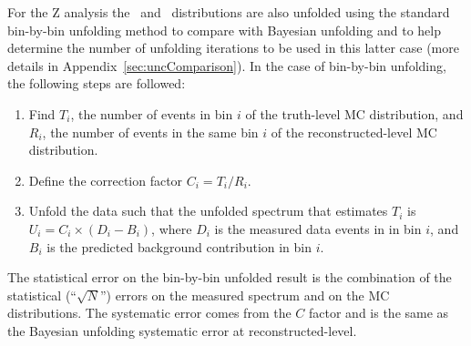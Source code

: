 For the Z analysis the \ptdilep\ and \ut\ distributions are also unfolded using the standard bin-by-bin unfolding method to compare with Bayesian unfolding and to help determine the number of unfolding iterations to be used in this latter case (more details in Appendix~\ref{sec:uncComparison}). In the case of bin-by-bin unfolding, the following steps are followed:
\begin{enumerate}
\item Find $T_{i}$, the number of events in bin $i$ of the truth-level MC distribution, and $R_{i}$, the number of events in the same bin $i$ of the reconstructed-level MC distribution.
\item Define the correction factor $C_{i} = T_{i}/R_{i}$.
\item Unfold the data such that the unfolded spectrum that estimates $T_{i}$ is $U_{i} = C_{i} \times (D_{i} - B_{i})$, where $D_{i}$ is the measured data events in in bin $i$, and $B_{i}$ is the predicted background contribution in bin $i$.
\end{enumerate}
The statistical error on the bin-by-bin unfolded result is the combination of the statistical (``$\sqrt{N}$'') errors on the measured spectrum and on the MC distributions. The systematic error comes from the $C$ factor and is the same as the Bayesian unfolding systematic error at reconstructed-level.




